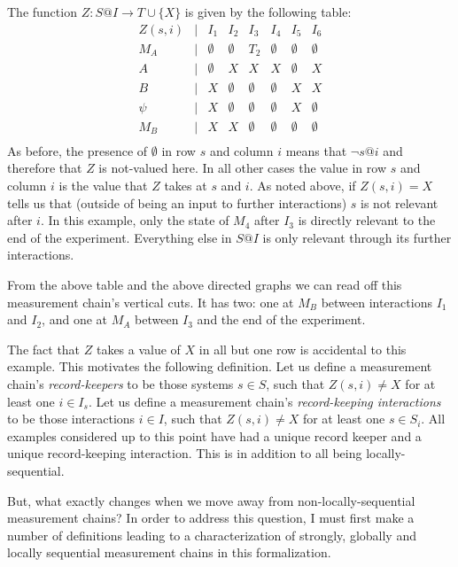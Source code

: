 \documentclass[12pt,prd,superscriptaddress,floatfix,amsmath,amssymb,amsfonts,nofootinbib]{revtex4-2}
\begin{document}
The function $Z:S@I\to T\cup\{X\}$ is given by the following table:
\[\begin{array}{cccccccc}
Z(s,i) & \vert & I_1 & I_2 & I_3 & I_4 & I_5 & I_6\\
M_A & \vert & \emptyset & \emptyset & T_2 & \emptyset & \emptyset & \emptyset\\
A & \vert & \emptyset & X & X & X & \emptyset & X\\
B & \vert & X & \emptyset & \emptyset & \emptyset & X & X\\
\psi & \vert & X & \emptyset & \emptyset & \emptyset & X & \emptyset\\
M_B & \vert & X & X & \emptyset & \emptyset & \emptyset & \emptyset\\
\end{array}\]
As before, the presence of $\emptyset$ in row $s$ and column $i$ means that $\neg s@i$ and therefore that $Z$ is not-valued here. In all other cases the value in row $s$ and column $i$ is the value that $Z$ takes at $s$ and $i$. As noted above, if $Z(s,i)=X$ tells us that (outside of being an input to further interactions) $s$ is not relevant after $i$. In this example, only the state of $M_4$ after $I_3$ is directly relevant to the end of the experiment. Everything else in $S@I$ is only relevant through its further interactions.

From the above table and the above directed graphs we can read off this measurement chain's vertical cuts. It has two: one at $M_B$ between interactions $I_1$ and $I_2$, and one at $M_A$ between $I_3$ and the end of the experiment.

The fact that $Z$ takes a value of $X$ in all but one row is accidental to this example. This motivates the following definition. Let us define a measurement chain's \textit{record-keepers} to be those systems $s\in S$, such that $Z(s,i)\neq X$ for at least one $i\in I_s$. Let us define a measurement chain's \textit{record-keeping interactions} to be those interactions $i\in I$, such that $Z(s,i)\neq X$ for at least one $s\in S_i$. All examples considered up to this point have had a unique record keeper and a unique record-keeping interaction. This is in addition to all being locally-sequential.

But, what exactly changes when we move away from non-locally-sequential measurement chains? In order to address this question, I must first make a number of definitions leading to a characterization of strongly, globally and locally sequential measurement chains in this formalization. 
\end{document}
